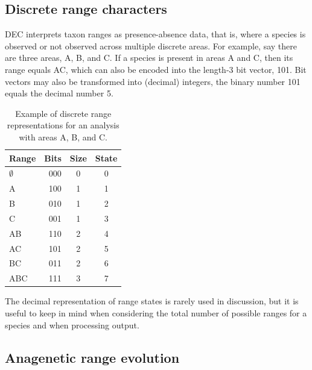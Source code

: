 \subsection{Discrete range characters}


DEC interprets taxon ranges as presence-absence data, that is, where a species is observed or not observed across multiple discrete areas.
For example, say there are three areas, A, B, and C.
If a species is present in areas A and C, then its range equals AC, which can also be encoded into the length-3 bit vector, 101.
Bit vectors may also be transformed into (decimal) integers, \EG the binary number 101 equals the decimal number 5.

\begin{table}[!ht]
\scriptsize
\centering
\begin{tabular}{lrcc}
Range & Bits & Size & State \\ \hline
$\emptyset$ & 000 & 0 & 0 \\
          A & 100 & 1 & 1 \\
          B & 010 & 1 & 2 \\
          C & 001 & 1 & 3 \\
         AB & 110 & 2 & 4 \\
         AC & 101 & 2 & 5 \\
         BC & 011 & 2 & 6 \\
        ABC & 111 & 3 & 7 \\
\end{tabular}
\caption{Example of discrete range representations for an analysis with areas A, B, and C.}
\end{table}

The decimal representation of range states is rarely used in discussion, but it is useful to keep in mind when considering the total number of possible ranges for a species and when processing output.

\subsection{Anagenetic range evolution}


